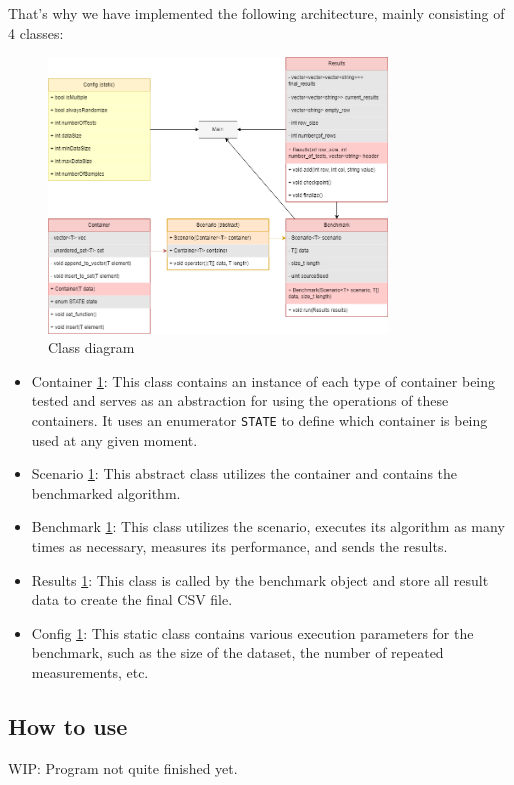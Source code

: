 \documentclass[conference]{IEEEtran}
\def\code#1{\texttt{#1}}
\begin{document}
That's why we have implemented the following architecture, mainly consisting of 4 classes:

\begin{figure}[!h]
	\includegraphics[width=9cm]{Diagram/architecture.png}
	\caption{Class diagram}
	\label{class diagram}
\end{figure}

\begin{itemize}
	\item Container \ref{class diagram}: This class contains an instance of each type of container being tested and serves as an abstraction for using the operations of these containers. It uses an enumerator \code{STATE} to define which container is being used at any given moment.
	\item Scenario \ref{class diagram}: This abstract class utilizes the container and contains the benchmarked algorithm.
	\item Benchmark \ref{class diagram}: This class utilizes the scenario, executes its algorithm as many times as necessary, measures its performance, and sends the results.
	\item Results \ref{class diagram}: This class is called by the benchmark object and store all result data to create the final CSV file.
	\item Config \ref{class diagram}: This static class contains various execution parameters for the benchmark, such as the size of the dataset, the number of repeated measurements, etc.
\end{itemize}

\subsection{How to use}

WIP: Program not quite finished yet.
\end{document}
